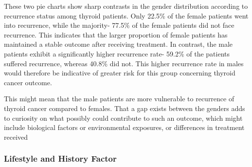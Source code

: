 \documentclass[12pt]{article}
\begin{document}
\begin{enumerate}
These two pie charts show sharp contrasts in the gender distribution according to recurrence status among thyroid patients. Only 22.5\% of the female patients went into recurrence, while the majority- 77.5\% of the female patients did not face recurrence. This indicates that the larger proportion of female patients has maintained a stable outcome after receiving treatment. In contrast, the male patients exhibit a significantly higher recurrence rate- 59.2\% of the patients suffered recurrence, whereas 40.8\% did not. This higher recurrence rate in males would therefore be indicative of greater risk for this group concerning thyroid cancer outcome.

\hspace{9pt} This might mean that the male patients are more vulnerable to recurrence of thyroid cancer compared to females. That a gap exists between the genders adds to curiosity on what possibly could contribute to such an outcome, which might include biological factors or environmental exposures, or differences in treatment received
\newpage

\end{enumerate}

\newpage

\subsubsection{Lifestyle and History Factor}
\end{document}
